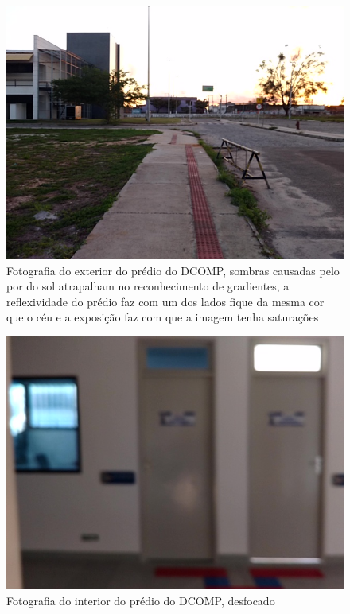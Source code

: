 \begin{figure}[H]
	\centering
		\includegraphics[width= \textwidth]{Imagens/figura4-16.jpg}
		\caption{Fotografia do exterior do prédio do DCOMP, sombras causadas pelo por do sol atrapalham no reconhecimento de gradientes, a reflexividade do prédio faz com um dos lados fique da mesma cor que o céu e a exposição faz com que a imagem tenha saturações}
	\label{fig4:16}
\end{figure}

\begin{figure}[H]
	\centering
		\includegraphics[width= \textwidth]{Imagens/figura4-17.jpg}
	\caption{Fotografia do interior do prédio do DCOMP, desfocado}
	\label{fig4:17}
\end{figure}

